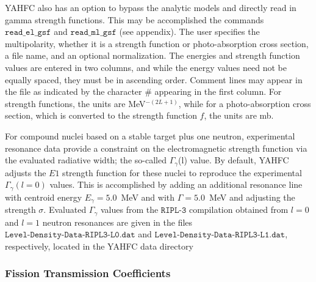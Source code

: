 \documentclass[
10pt,
showpacs,preprintnumbers,footinbib,
amsfonts,amsmath,amssymb,
aps,
prc,twocolumn,groupedaddress,superscriptaddress,
showkeys,
nofootinbib
]{revtex4-1}
\begin{document}
YAHFC also has an option to bypass the analytic models and directly read in gamma strength functions. This may be accomplished the commands 
${\texttt{read\_el\_gsf}}$ and ${\texttt{read\_ml\_gsf}}$ (see appendix). The user specifies the multipolarity, whether it is a strength function or photo-absorption cross section, a file name, and an optional normalization. The energies and strength function values are entered in two columns, and while the energy values need not be equally spaced, they must be in ascending order. Comment lines may appear in the file as indicated by the character \# appearing in the first column. For strength functions, the units are MeV$^{-{(2L+1)}}$, while for a photo-absorption cross section, which is converted to the strength function $f$, the units are mb.


For compound nuclei based on a stable target plus one neutron, experimental resonance data provide a constraint on the electromagnetic strength function via the evaluated radiative width; the so-called $\Gamma_\gamma$(l) value. By default, YAHFC adjusts the $E1$ strength function for these nuclei to reproduce the experimental $\Gamma_\gamma(l=0)$ values. This is accomplished by adding an additional resonance line with centroid energy $E_\gamma = 5.0$~MeV and with $\Gamma = 5.0$~MeV and adjusting the strength $\sigma$. Evaluated $\Gamma_\gamma$ values from the ${\texttt{RIPL-3}}$ compilation obtained from $l=0$ and $l=1$ neutron resonances are given in the files ${\texttt{Level-Density-Data-RIPL3-L0.dat}}$ and ${\texttt{Level-Density-Data-RIPL3-L1.dat}}$, respectively, located in the YAHFC data directory

\subsubsection{Fission Transmission Coefficients}
\end{document}
